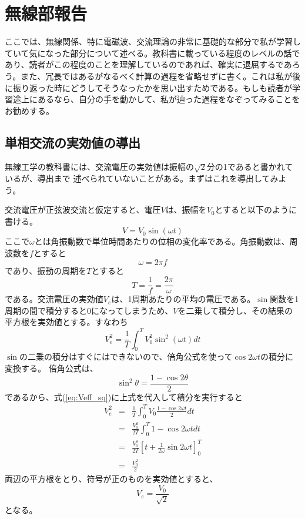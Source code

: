 \chapter{無線部報告}
ここでは、無線関係、特に電磁波、交流理論の非常に基礎的な部分で私が学習していて気になった部分について述べる。教科書に載っている程度のレベルの話であり、読者がこの程度のことを理解しているのであれば、確実に退屈するであろう。また、冗長ではあるがなるべく計算の過程を省略せずに書く。これは私が後に振り返った時にどうしてそうなったかを思い出すためである。もしも読者が学習途上にあるなら、自分の手を動かして、私が辿った過程をなぞってみることをお勧めする。

\section{単相交流の実効値の導出}
無線工学の教科書には、交流電圧の実効値は振幅の$\sqrt{2}$分の1であると書かれているが、導出まで
述べられていないことがある。まずはこれを導出してみよう。

交流電圧が正弦波交流と仮定すると、電圧$V$は、振幅を$V_0$とすると以下のように書ける。
\begin{equation}
V=V_0 \sin(\omega t) \label{eq:defv}
\end{equation}
ここで$\omega$とは角振動数で単位時間あたりの位相の変化率である。角振動数は、周波数を$f$とすると
\[
\omega = 2 \pi f
\]
であり、振動の周期を$T$とすると
\[
T = \frac{1}{f} = \frac{2 \pi}{\omega}
\]
である。交流電圧の実効値$V_e$は、1周期あたりの平均の電圧である。$\sin$関数を1周期の間で積分すると$0$になってしまうため、$V$を二乗して積分し、その結果の平方根を実効値とする。すなわち
\begin{equation}
V_e^2 =\frac{1}{T} \int_{0}^{T}V_0^2\sin^2(\omega t)dt \label{eq:Veff_sq}
\end{equation}
$\sin$の二乗の積分はすぐにはできないので、倍角公式を使って$\cos 2\omega t$の積分に変換する。
倍角公式は、
\[
\sin^2\theta = \frac{1-\cos 2\theta}{2}
\]
であるから、式(\ref{eq:Veff_sq})に上式を代入して積分を実行すると
\begin{eqnarray*}
V_e^2 &=& \frac{1}{T}\int_{0}^{T} V_0 \frac{1-\cos 2\omega t}{2} dt \\
&=& \frac{V_0^2}{2T}\int_0^{T} 1 - \cos 2\omega t dt \\
&=& \frac{V_0^2}{2T}[t + \frac{1}{2 \omega}\sin 2\omega t ]_0^{T} \\
&=& \frac{V_0^2}{2}
\end{eqnarray*}
両辺の平方根をとり、符号が正のものを実効値とすると、
\[
V_e = \frac{V_0}{\sqrt{2}}
\]
となる。

